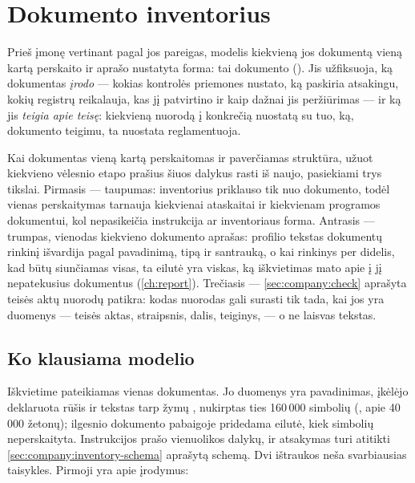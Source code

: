 \section{Dokumento inventorius}\label{sec:company:inventory}

Prieš įmonę vertinant pagal jos pareigas, modelis kiekvieną jos dokumentą vieną kartą perskaito
ir aprašo nustatyta forma: tai dokumento  (). Jis
užfiksuoja, ką dokumentas \emph{įrodo} --- kokias kontrolės priemones nustato, ką paskiria
atsakingu, kokių registrų reikalauja, kas jį patvirtino ir kaip dažnai jis peržiūrimas --- ir ką
jis \emph{teigia apie teisę}: kiekvieną nuorodą į konkrečią nuostatą su tuo, ką, dokumento
teigimu, ta nuostata reglamentuoja.

Kai dokumentas vieną kartą perskaitomas ir paverčiamas struktūra, užuot kiekvieno vėlesnio
etapo prašius šiuos dalykus rasti iš naujo, pasiekiami trys tikslai. Pirmasis --- taupumas: inventorius priklauso tik nuo
dokumento, todėl vienas perskaitymas tarnauja kiekvienai ataskaitai ir kiekvienam programos
dokumentui, kol nepasikeičia instrukcija ar inventoriaus forma. Antrasis --- trumpas, vienodas
kiekvieno dokumento aprašas: profilio tekstas dokumentų rinkinį išvardija pagal pavadinimą,
tipą ir santrauką, o kai rinkinys per didelis, kad būtų siunčiamas visas, ta eilutė yra viskas, ką iškvietimas
mato apie į jį nepatekusius dokumentus (\cref{ch:report}). Trečiasis --- \cref{sec:company:check}
aprašyta teisės aktų nuorodų patikra: kodas nuorodas gali surasti tik tada, kai jos yra duomenys
--- teisės aktas, straipsnis, dalis, teiginys, --- o ne laisvas tekstas.

\subsection{Ko klausiama modelio}\label{sec:company:inventory-prompt}

Iškvietime pateikiamas vienas dokumentas. Jo duomenys yra pavadinimas, įkėlėjo deklaruota
rūšis ir tekstas tarp žymų , nukirptas ties 160\,000 simbolių
(, apie 40\,000 žetonų); ilgesnio dokumento pabaigoje pridedama
eilutė, kiek simbolių neperskaityta. Instrukcijos prašo vienuolikos dalykų, ir atsakymas turi
atitikti \cref{sec:company:inventory-schema} aprašytą schemą. Dvi ištraukos neša svarbiausias
taisykles. Pirmoji yra apie įrodymus:

